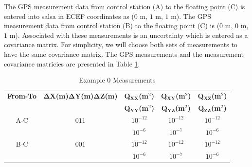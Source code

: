 The GPS measurement data from control station (A) to the floating point (C) is entered into \textsf{salsa} in ECEF coordinates as ($0$ m, $1$ m, $1$ m).  The GPS measurement data from control station (B) to the floating point (C) is ($0$ m, $0$ m, $1$ m).  Associated with these measurements is an uncertainty which is entered as a covariance matrix.  For simplicity, we will choose both sets of measurements to have the same covariance matrix.  The GPS measurements and the measurement covariance matricies are presented in Table \ref{tab:ex0M}.

\begin{table}[htb]
\caption{Example $0$ Measurements}
\label{tab:ex0M}
\begin{center}
\begin{tabular}{ccccc}
\hline
\textbf{From-To}&\textbf{$\mathbf{\Delta}$X(m)\hspace*{3mm}$\mathbf{\Delta}$Y(m)\hspace*{3mm}$\mathbf{\Delta}$Z(m)}&\textbf{Q$_{\textbf{XX}}$(m$^2$)}&\textbf{Q$_{\textbf{XY}}$(m$^2$)}&\textbf{Q$_{\textbf{XZ}}$(m$^2$)}\\
&&\textbf{Q$_{\textbf{YY}}$(m$^2$)}&\textbf{Q$_{\textbf{YZ}}$(m$^2$)}&\textbf{Q$_{\textbf{ZZ}}$(m$^2$)}\\
\hline
A-C & $0$\hspace*{12mm}$1$\hspace*{12mm}$1$ &$10^{-12}$&$10^{-12}$&$10^{-12}$\\
    &           &$10^{-6}$&$10^{-7}$&$10^{-6}$\\
B-C & $0$\hspace*{12mm}$0$\hspace*{12mm}$1$ &$10^{-12}$&$10^{-12}$&$10^{-12}$\\
    &           &$10^{-6}$&$10^{-7}$&$10^{-6}$\\
\hline
\end{tabular}
\end{center}
\end{table}

